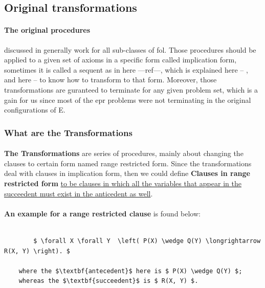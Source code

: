\subsection{Original transformations}\label{sub:c3s1s1}
	\paragraph{The original procedures} discussed in \cite{BMUG06} generally work for all sub-classes of \ac{fol}. Those procedures should be applied to a given set of axioms in a specific form called implication form, sometimes it is called a sequent as in here ---ref---, which is explained here -- , and here -- to know how to transform to that form. Moreover, those transformations are guranteed to terminate for any given problem set, which is a gain for us since most of the \ac{epr} problems were not terminating in the original configurations of E.  

	\subsubsection{What are the Transformations}
	
		\paragraph{} 
		\textbf{The Transformations} are series of procedures, mainly about changing the clauses to certain form named range restricted form. Since the transformations deal with clauses in implication form, then we could define \textbf{Clauses in range restricted form} \ul{to be clauses in which all the variables that appear in the succeedent must exist in the anticedent as well}.
	
		\paragraph{} 
		\textbf{An example for a range restricted clause} is found below:
			\begin{lstlisting}[caption=Range Restricted Clause Example,frame=single,mathescape]			
		
		$ \forall X \forall Y  \left( P(X) \wedge Q(Y) \longrightarrow R(X, Y) \right). $				
		
	where the $\textbf{antecedent}$ here is $ P(X) \wedge Q(Y) $;
	whereas the $\textbf{succeedent}$ is $ R(X, Y) $.
 			\end{lstlisting}
		
